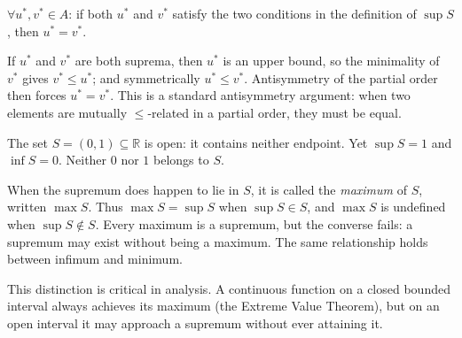 \begin{remark*}
$\forall u^*, v^* \in A$: if both $u^*$ and $v^*$ satisfy the two conditions
in the definition of $\sup S$, then $u^* = v^*$.
\end{remark*}

\begin{remark*}
If $u^*$ and $v^*$ are both suprema, then $u^*$ is an upper bound, so
the minimality of $v^*$ gives $v^* \leq u^*$; and symmetrically $u^* \leq v^*$.
Antisymmetry of the partial order then forces $u^* = v^*$.  This is a
standard antisymmetry argument: when two elements are mutually $\leq$-related
in a partial order, they must be equal.
\end{remark*}


\begin{remark*}
\label{rem:max-vs-sup}
The set $S = (0,1) \subseteq \mathbb{R}$ is open: it contains neither
endpoint.  Yet $\sup S = 1$ and $\inf S = 0$.  Neither $0$ nor $1$
belongs to $S$.

When the supremum does happen to lie in $S$, it is called the
\emph{maximum} of $S$, written $\max S$.  Thus $\max S = \sup S$ when
$\sup S \in S$, and $\max S$ is undefined when $\sup S \notin S$.
Every maximum is a supremum, but the converse fails: a supremum may
exist without being a maximum.  The same relationship holds between
infimum and minimum.

This distinction is critical in analysis.  A continuous function on a
closed bounded interval always achieves its maximum (the Extreme Value
Theorem), but on an open interval it may approach a supremum without
ever attaining it.
\end{remark*}


